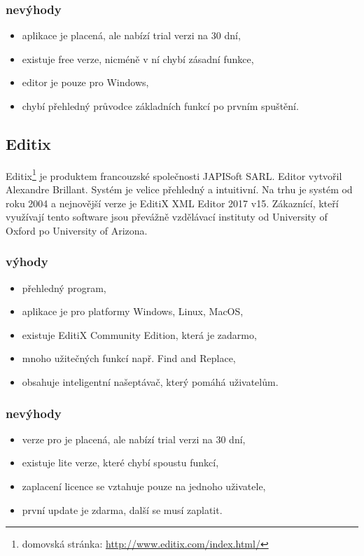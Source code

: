             \subsubsection{nevýhody}
                \begin{itemize}
                    \item aplikace je placená, ale nabízí trial verzi na 30 dní,
                    \item existuje free verze, nicméně v ní chybí zásadní funkce,
                    \item editor je pouze pro Windows,
                    \item chybí přehledný průvodce základních funkcí po prvním spuštění.
                \end{itemize}
                
        \subsection{Editix} 
            Editix\footnote{domovská stránka: \url{http://www.editix.com/index.html/}} je produktem francouzské společnosti JAPISoft SARL. Editor vytvořil Alexandre Brillant. Systém je velice přehledný a intuitivní. Na trhu je systém od roku 2004 a nejnovější verze je EditiX XML Editor 2017 v15. Zákaznící, kteří využívají tento software jsou převážně vzdělávací instituty od University of Oxford po University of Arizona.
            
            \subsubsection{výhody}
                \begin{itemize}
                    \item přehledný program,
                    \item aplikace je pro platformy Windows, Linux, MacOS,
                    \item existuje EditiX Community Edition, která je zadarmo,
                    \item mnoho užitečných funkcí např. Find and Replace,
                    \item obsahuje inteligentní našeptávač, který pomáhá uživatelům.
                \end{itemize}
                
            \subsubsection{nevýhody}
                \begin{itemize}
                    \item verze pro je placená, ale nabízí trial verzi na 30 dní,
                    \item existuje lite verze, které chybí spoustu funkcí,
                    \item zaplacení licence se vztahuje pouze na jednoho uživatele,
                    \item první update je zdarma, další se musí zaplatit.
                \end{itemize}
                
